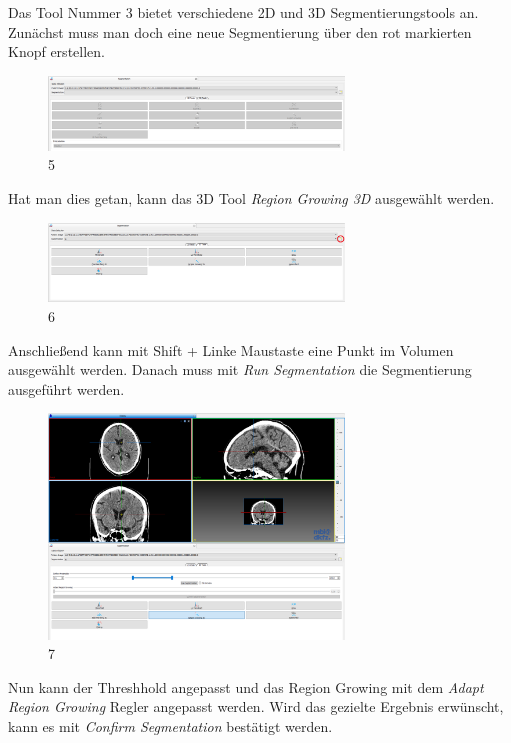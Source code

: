 Das Tool Nummer 3  bietet verschiedene 2D und 3D Segmentierungstools an. Zunächst muss man doch eine neue Segmentierung über den rot markierten Knopf erstellen.

\begin{figure}[H]
\centering 
\includegraphics[width=0.7\textwidth]{Logos/MITK_Doku/5.PNG}
\caption{5} 
\label{fig:fuenf} 
\end{figure}

Hat man dies getan, kann das 3D Tool \textit{Region Growing 3D} ausgewählt werden.

\begin{figure}[H] 
\centering 
\includegraphics[width=0.7\textwidth]{Logos/MITK_Doku/6.PNG}
\caption{6} 
\label{fig:sechs} 
\end{figure}

Anschließend kann mit Shift + Linke Maustaste eine Punkt im Volumen ausgewählt werden. Danach muss mit  \textit{Run Segmentation} die Segmentierung ausgeführt werden.

\begin{figure}[H] 
\centering 
\includegraphics[width=0.7\textwidth]{Logos/MITK_Doku/7.PNG}
\caption{7} 
\label{fig:sieben} 
\end{figure}

Nun kann der Threshhold angepasst und das Region Growing mit dem \textit{Adapt Region Growing} Regler angepasst werden. Wird das gezielte Ergebnis erwünscht, kann es mit \textit{Confirm Segmentation} bestätigt werden.

